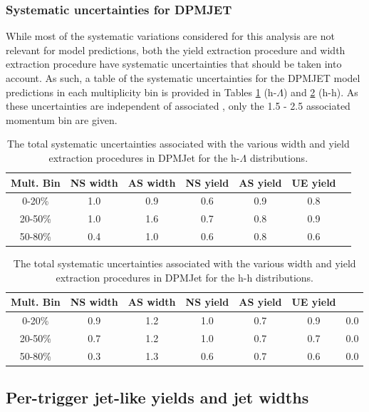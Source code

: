 \subsubsection{Systematic uncertainties for DPMJET}
\label{sec:dpmjet_systematics}
While most of the systematic variations considered for this analysis are not relevant for model predictions, both the yield extraction procedure and width extraction procedure have systematic uncertainties that should be taken into account. As such, a table of the systematic uncertainties for the DPMJET model predictions in each multiplicity bin is provided in Tables \ref{dpmjet_systematics_table_lambda} (h-$\Lambda$) and \ref{dpmjet_systematics_table_h} (h-h). As these uncertainties are independent of associated \pt, only the 1.5 - 2.5 \GeVc associated momentum bin are given. 

\begin{table}[ht]
\centering
\begin{tabular}{|c||c|c|c|c|c|c|}
\hline
Mult. Bin & NS width & AS width & NS yield & AS yield & UE yield  \\
\hline
0-20\% &  1.0 & 0.9 & 0.6 & 0.9 & 0.8  \\
20-50\% &  1.0 & 1.6 & 0.7 & 0.8 & 0.9  \\
50-80\% &  0.4 & 1.0 & 0.6 & 0.8 & 0.6  \\
\hline
\end{tabular}
\caption{The total systematic uncertainties associated with the various width and yield extraction procedures in DPMJet for the h-$\Lambda$ distributions.}
\label{dpmjet_systematics_table_lambda}
\end{table}

\begin{table}[ht]
\centering
\begin{tabular}{|c||c|c|c|c|c|c|}
\hline
Mult. Bin & NS width & AS width & NS yield & AS yield & UE yield \\
\hline
0-20\% &  0.9 & 1.2 & 1.0 & 0.7 & 0.9 & 0.0 \\
20-50\% &  0.7 & 1.2 & 1.0 & 0.7 & 0.7 & 0.0 \\
50-80\% &  0.3 & 1.3 & 0.6 & 0.7 & 0.6 & 0.0 \\
\hline
\end{tabular}
\caption{The total systematic uncertainties associated with the various width and yield extraction procedures in DPMJet for the h-h distributions.}
\label{dpmjet_systematics_table_h}
\end{table}

\subsection{Per-trigger jet-like yields and jet widths}
\label{sec:pairwise_yields_modelcomp}

